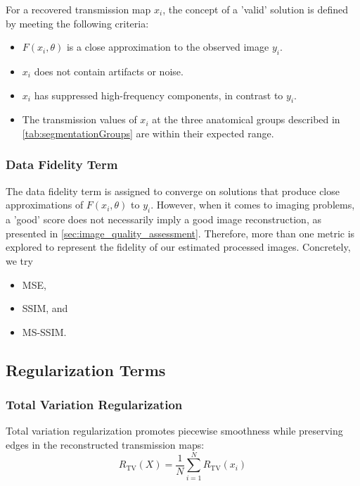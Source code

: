 \documentclass[nomenclature, english, bibtex]{kththesis}
\numberwithin{listing}{chapter}
\begin{document}
For a recovered transmission map $x_i$, the concept of a 'valid' solution is defined by meeting the following criteria:
\begin{itemize}
    \item $F(x_i, \theta)$ is a close approximation to the observed image $y_i$.
    \item $x_i$ does not contain artifacts or noise.
    \item $x_i$ has suppressed high-frequency components, in contrast to $y_i$.
    \item The transmission values of $x_i$ at the three anatomical groups described in \autoref{tab:segmentationGroups}
    are within their expected range.
\end{itemize}

\subsubsection{Data Fidelity Term}

The data fidelity term is assigned to converge on solutions that produce close approximations of $F(x_i, \theta)$
to $y_i$. However, when it comes to imaging problems, a 'good' score does not necessarily imply a good image
reconstruction, as presented in \autoref{sec:image_quality_assessment}. Therefore, more than one metric is
explored to represent the fidelity of our estimated processed images. Concretely, we try

\begin{itemize}
    \item \acrshort{MSE},
    \item \acrshort{SSIM}, and
    \item \acrshort{MS-SSIM}.
\end{itemize}


\subsection{Regularization Terms}

\subsubsection{Total Variation Regularization}
Total variation regularization promotes piecewise smoothness while preserving edges in the reconstructed transmission maps:
\begin{equation}
R_{\text{TV}}(X) = \frac{1}{N} \sum_{i=1}^N R_{\text{TV}}(x_i)
\end{equation}
\end{document}
